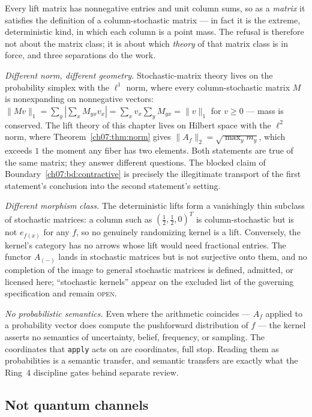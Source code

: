 Every lift matrix has nonnegative entries and unit column sums, so as a
\emph{matrix} it satisfies the definition of a column-stochastic matrix ---
in fact it is the extreme, deterministic kind, in which each column is a
point mass. The refusal is therefore not about the matrix class; it is about
which \emph{theory} of that matrix class is in force, and three separations
do the work.

\emph{Different norm, different geometry.} Stochastic-matrix theory lives on
the probability simplex with the $\ell^1$ norm, where every column-stochastic
matrix $M$ is nonexpanding on nonnegative vectors:
$\lVert Mv\rVert_1=\sum_y|\sum_x M_{yx}v_x|=\sum_x v_x\sum_y M_{yx}
=\lVert v\rVert_1$ for $v\ge 0$ --- mass is conserved. The lift theory of
this chapter lives on Hilbert space with the $\ell^2$ norm, where
Theorem~\ref{ch07:thm:norm} gives $\lVert A_f\rVert_2=\sqrt{\max_y m_y}$,
which exceeds $1$ the moment any fiber has two elements. Both statements are
true of the same matrix; they answer different questions. The blocked claim
of Boundary~\ref{ch07:bd:contractive} is precisely the illegitimate
transport of the first statement's conclusion into the second statement's
setting.

\emph{Different morphism class.} The deterministic lifts form a vanishingly
thin subclass of stochastic matrices: a column such as
$(\tfrac12,\tfrac12,0)^T$ is column-stochastic but is not $e_{f(x)}$ for any
$f$, so no genuinely randomizing kernel is a lift. Conversely, the kernel's
category has no arrows whose lift would need fractional entries. The functor
$A_{(-)}$ lands in stochastic matrices but is not surjective onto them, and
no completion of the image to general stochastic matrices is defined,
admitted, or licensed here; ``stochastic kernels'' appear on the excluded
list of the governing specification and remain \textsc{open}.

\emph{No probabilistic semantics.} Even where the arithmetic coincides ---
$A_f$ applied to a probability vector does compute the pushforward
distribution of $f$ --- the kernel asserts no semantics of uncertainty,
belief, frequency, or sampling. The coordinates that \texttt{apply} acts on
are coordinates, full stop. Reading them as probabilities is a semantic
transfer, and semantic transfers are exactly what the Ring~4 discipline
gates behind separate review.

\subsection{Not quantum channels}\label{ch07:sec:notquantum}


